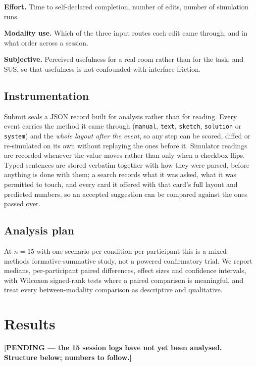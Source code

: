 \documentclass[manuscript,review,anonymous]{acmart}
\begin{document}
\textbf{Effort.} Time to self-declared completion, number of edits, number of
simulation runs.

\textbf{Modality use.} Which of the three input routes each edit came through,
and in what order across a session.

\textbf{Subjective.} Perceived usefulness for a real room rather than for the
task, and SUS, so that usefulness is not confounded with interface friction.

\subsection{Instrumentation}

Submit seals a JSON record built for analysis rather than for reading. Every
event carries the method it came through (\texttt{manual}, \texttt{text},
\texttt{sketch}, \texttt{solution} or \texttt{system}) and the \emph{whole
layout after the event}, so any step can be scored, diffed or re-simulated on
its own without replaying the ones before it. Simulator readings are recorded
whenever the value moves rather than only when a checkbox flips. Typed sentences
are stored verbatim together with how they were parsed, before anything is done
with them; a search records what it was asked, what it was permitted to touch,
and every card it offered with that card's full layout and predicted numbers, so
an accepted suggestion can be compared against the ones passed over.

\subsection{Analysis plan}

At $n=15$ with one scenario per condition per participant this is a
mixed-methods formative-summative study, not a powered confirmatory trial. We
report medians, per-participant paired differences, effect sizes and confidence
intervals, with Wilcoxon signed-rank tests where a paired comparison is
meaningful, and treat every between-modality comparison as descriptive and
qualitative.

\section{Results}
\label{sec:results}

\textbf{[PENDING --- the 15 session logs have not yet been analysed. Structure
below; numbers to follow.]}
\end{document}
